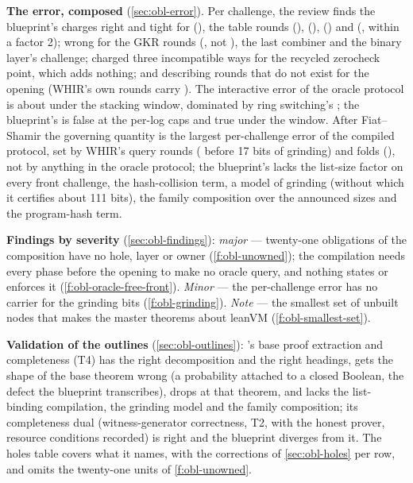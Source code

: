 \textbf{The error, composed} (\cref{sec:obl-error}). Per challenge, the review finds the blueprint's charges right and tight for  (), the table rounds (),  (),  () and  (, within a factor 2); wrong for the GKR rounds (, not ), the last combiner and the binary layer's challenge; charged three incompatible ways for the recycled zerocheck point, which adds nothing; and describing rounds that do not exist for the opening (WHIR's own rounds carry ). The interactive error of the oracle protocol is about  under the stacking window, dominated by ring switching's ; the blueprint's  is false at the per-log caps and true under the window. After Fiat–Shamir the governing quantity is the largest per-challenge error of the compiled protocol, set by WHIR's query rounds ( before 17 bits of grinding) and folds (), not by anything in the oracle protocol; the blueprint's  lacks the list-size factor  on every front challenge, the hash-collision term, a model of grinding (without which it certifies about 111 bits), the family composition over the announced sizes and the program-hash term.

\textbf{Findings by severity} (\cref{sec:obl-findings}): \emph{major} — twenty-one obligations of the composition have no hole, layer or owner (\cref{f:obl-unowned}); the compilation needs every phase before the opening to make no oracle query, and nothing states or enforces it (\cref{f:obl-oracle-free-front}). \emph{Minor} — the per-challenge error has no carrier for the grinding bits (\cref{f:obl-grinding}). \emph{Note} — the smallest set of unbuilt nodes that makes the master theorems about leanVM (\cref{f:obl-smallest-set}).

\textbf{Validation of the outlines} (\cref{sec:obl-outlines}): 's base proof extraction and completeness (T4) has the right decomposition and the right headings, gets the shape of the base theorem wrong (a probability attached to a closed Boolean, the defect the blueprint transcribes), drops  at that theorem, and lacks the list-binding compilation, the grinding model and the family composition; its completeness dual (witness-generator correctness, T2, with the honest prover, resource conditions recorded) is right and the blueprint diverges from it. The holes table covers what it names, with the corrections of \cref{sec:obl-holes} per row, and omits the twenty-one units of \cref{f:obl-unowned}.

